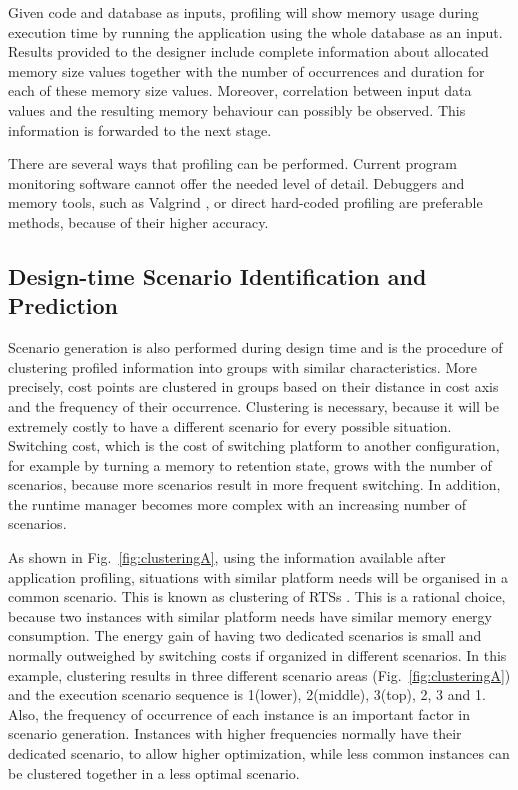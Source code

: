 Given code and database as inputs, profiling will show memory usage during execution time by running the application using the whole database as an input. Results provided to the designer include complete information about allocated memory size values together with the number of occurrences and duration for each of these memory size values. Moreover, correlation between input data values and the resulting memory behaviour can possibly be observed. This information is forwarded to the next stage.

There are several ways that profiling can be performed. Current program monitoring software cannot offer the needed level of detail. Debuggers and memory tools, such as Valgrind \cite{Valgrind}, or direct hard-coded profiling are preferable methods, because of their higher accuracy.

\subsection{Design-time Scenario Identification and Prediction}

Scenario generation is also performed during design time and is the procedure of clustering profiled information into groups with similar characteristics. More precisely, cost points are clustered in groups based on their distance in cost axis and the frequency of their occurrence. Clustering is necessary, because it will be extremely costly to have a different scenario for every possible situation. Switching cost, which is the cost of switching platform to another configuration, for example by turning a memory to retention state, grows with the number of scenarios, because more scenarios result in more frequent switching. In addition, the runtime manager becomes more complex with an increasing number of scenarios.

As shown in Fig.~\ref{fig:clusteringA}, using the information available after application profiling, situations with similar platform needs will be organised in a common scenario. This is known as clustering of RTSs \cite{Gheorghita2007}. This is a rational choice, because two instances with similar platform needs have similar memory energy consumption. The energy gain of having two dedicated scenarios is small and normally outweighed by switching costs if organized in different scenarios. In this example, clustering results in three different scenario areas (Fig.~\ref{fig:clusteringA}) and the execution scenario sequence is 1(lower), 2(middle), 3(top), 2, 3 and 1. Also, the frequency of occurrence of each instance is an important factor in scenario generation. Instances with higher frequencies normally have their dedicated scenario, to allow higher optimization, while less common instances can be clustered together in a less optimal scenario. 

